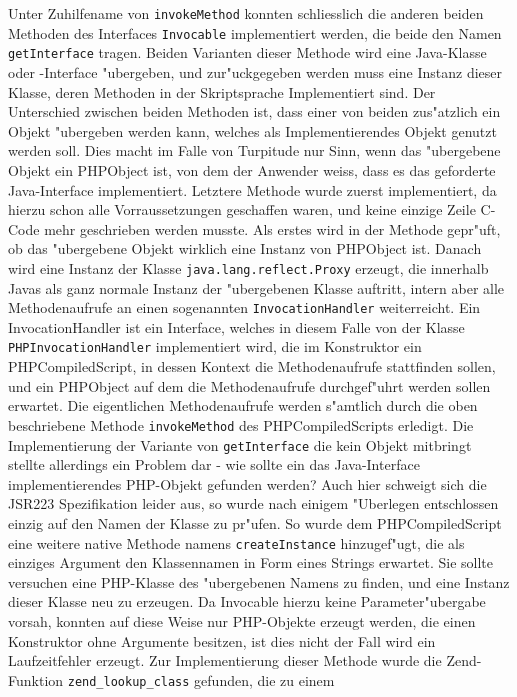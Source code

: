 Unter Zuhilfename von \texttt{invokeMethod} konnten schliesslich die anderen beiden Methoden des Interfaces \texttt{Invocable} implementiert werden, die beide
den Namen \texttt{getInterface} tragen. Beiden Varianten dieser Methode wird eine Java-Klasse oder -Interface "ubergeben, und zur"uckgegeben werden muss eine 
Instanz dieser Klasse, deren Methoden in der Skriptsprache Implementiert sind. Der Unterschied zwischen beiden Methoden ist, dass einer von beiden 
zus"atzlich ein Objekt "ubergeben werden kann, welches als Implementierendes Objekt genutzt werden soll. Dies macht im Falle von Turpitude nur Sinn, wenn das 
"ubergebene Objekt ein PHPObject ist, von dem der Anwender weiss, dass es das geforderte Java-Interface implementiert. Letztere Methode wurde zuerst implementiert,
da hierzu schon alle Vorraussetzungen geschaffen waren, und keine einzige Zeile C-Code mehr geschrieben werden musste. Als erstes wird in der Methode gepr"uft, ob
das "ubergebene Objekt wirklich eine Instanz von PHPObject ist. Danach wird eine Instanz der Klasse \texttt{java.lang.reflect.Proxy} erzeugt, die innerhalb Javas
als ganz normale Instanz der "ubergebenen Klasse auftritt, intern aber alle Methodenaufrufe an einen sogenannten \texttt{InvocationHandler} weiterreicht.
Ein InvocationHandler ist ein Interface, welches in diesem Falle von der Klasse \texttt{PHPInvocationHandler} implementiert wird, die im Konstruktor
ein PHPCompiledScript, in dessen Kontext die Methodenaufrufe stattfinden sollen, und ein PHPObject auf dem die Methodenaufrufe durchgef"uhrt werden sollen erwartet.
Die eigentlichen Methodenaufrufe werden s"amtlich durch die oben beschriebene Methode \texttt{invokeMethod} des PHPCompiledScripts erledigt.
Die Implementierung der Variante von \texttt{getInterface} die kein Objekt mitbringt stellte allerdings ein Problem dar - wie sollte ein das Java-Interface implementierendes
PHP-Objekt gefunden werden? Auch hier schweigt sich die JSR223 Spezifikation leider aus, so wurde nach einigem "Uberlegen entschlossen einzig auf den Namen der Klasse zu
pr"ufen. So wurde dem PHPCompiledScript eine weitere native Methode namens \texttt{createInstance} hinzugef"ugt, die als einziges Argument den 
Klassennamen in Form eines Strings erwartet. Sie sollte versuchen eine PHP-Klasse des "ubergebenen Namens zu finden, und eine Instanz dieser Klasse neu zu erzeugen.
Da Invocable hierzu keine Parameter"ubergabe vorsah, konnten auf diese Weise nur PHP-Objekte erzeugt werden, die einen Konstruktor ohne Argumente besitzen, ist 
dies nicht der Fall wird ein Laufzeitfehler erzeugt. Zur Implementierung dieser Methode wurde die Zend-Funktion \texttt{zend\_lookup\_class} gefunden, die zu einem
